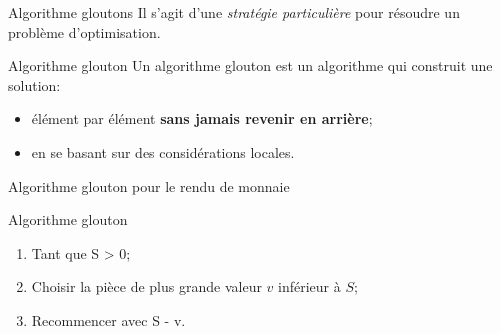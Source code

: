 \documentclass[10pt,xcolor=dvipsnames]{beamer}
\newcommand{\defin}[1]{\textcolor{darkspringgreen}{#1}}
\begin{document}
\begin{frame}{Algorithme gloutons}
Il s'agit d'une \textit{stratégie particulière} pour résoudre un problème d'optimisation.
    \begin{exampleblock}{Algorithme glouton}
    Un \defin{algorithme glouton} est un algorithme qui construit une solution:
    \begin{itemize}
        \item élément par élément \textbf{sans jamais revenir en arrière};
        \item en se basant sur des considérations locales.
    \end{itemize}
    \end{exampleblock}
    
\end{frame}

\begin{frame}{Algorithme glouton pour le rendu de monnaie}
    \begin{alertblock}{Algorithme glouton}
    \begin{enumerate}
        \item Tant que S > 0;
        \item Choisir la pièce de plus grande valeur $v$ inférieur à $S$;
        \item Recommencer avec S - v.
    \end{enumerate}
    \end{alertblock}
\end{frame}
\end{document}
